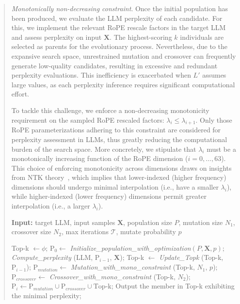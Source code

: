 \begin{abstract}
\textit{Monotonically non-decreasing constraint}. Once the initial population has been produced, we evaluate the LLM perplexity of each candidate. For this, we implement the relevant RoPE rescale factors in the target LLM and assess perplexity on input $\mathbf{X}$. The highest-scoring $k$ individuals are selected as parents for the evolutionary process. Nevertheless, due to the expansive search space, unrestrained mutation and crossover can frequently generate low-quality candidates, resulting in excessive and redundant perplexity evaluations. This inefficiency is exacerbated when $L'$ assumes large values, as each perplexity inference requires significant computational effort.

To tackle this challenge, we enforce a non-decreasing monotonicity requirement on the sampled RoPE rescaled factors: $\lambda_i \leq \lambda_{i+1}$. Only those RoPE parameterizations adhering to this constraint are considered for perplexity assessment in LLMs, thus greatly reducing the computational burden of the search space. More concretely, we stipulate that $\lambda_i$ must be a monotonically increasing function of the RoPE dimension ($i = 0,\ldots,63$). This choice of enforcing monotonicity across dimensions draws on insights from NTK theory~\cite{jacot2018neural,tancik2020fourier,ntk}, which implies that lower-indexed (higher frequency) dimensions should undergo minimal interpolation (i.e., have a smaller $\lambda_i$), while higher-indexed (lower frequency) dimensions permit greater interpolation (i.e., a larger $\lambda_i$).

\begin{algorithm}[t]
	\small
	\caption{The search algorithm}
	\textbf{Input:} target LLM, input samples $\mathbf{X}$, population size $P$, mutation size $N_1$, crossover size $N_2$, max iterations $\mathcal{T}$, mutate probability $p$\\

	\begin{algorithmic}[1]
		\label{alg:search}
		\STATE Top-k $\gets \phi$;
		\STATE $\text{P}_0 \gets$ \textit{Initialize\_population\_with\_optimization}$(P, \mathbf{X}, p)$;
		\STATE \textit{Compute\_perplexity} (LLM, $\text{P}_{i-1}$, $\mathbf{X}$);
		\STATE Top-k $\gets$ \textit{Update\_Topk} (Top-k, $\text{P}_{i-1}$);
		\STATE $\text{P}_{mutation} \gets$ \textit{Mutation\_with\_mono\_constraint} (Top-k, $N_1$, $p$);
		\STATE $\text{P}_{crossover} \gets$ \textit{Crossover\_with\_mono\_constraint} (Top-k, $N_2$);
		\STATE $\text{P}_i \gets \text{P}_{mutation} \cup \text{P}_{crossover} \cup \text{Top-k}$;
		\ENDFOR
		\STATE Output the member in Top-k exhibiting the minimal perplexity;
	\end{algorithmic}
\end{algorithm}


\end{abstract}
